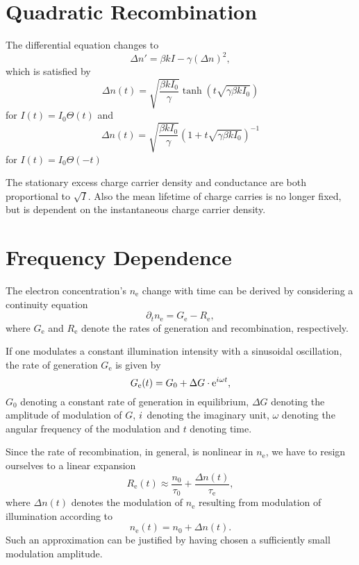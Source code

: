 \section{Quadratic Recombination}\label{sec:quad-recomb}
The differential equation changes to
\begin{equation*}
	\Delta n' = \beta k I - \gamma (\Delta n)^2,
\end{equation*}
which is satisfied by
\begin{equation*}
	\Delta n (t) = \sqrt{\frac{\beta k I_0}{\gamma}} \tanh \left(t \sqrt{\gamma \beta k I_0} \right)
\end{equation*}
for $I(t) = I_0 \Theta (t)$ and
\begin{equation*}
	\Delta n (t) = \sqrt{\frac{\beta k I_0}{\gamma}} \left(1 + t \sqrt{\gamma \beta k I_0} \right)^{-1}
\end{equation*}
for $I(t) = I_0 \Theta (-t)$

The stationary excess charge carrier density and conductance are both proportional to $\sqrt{I}$.
Also the mean lifetime of charge carries is no longer fixed, but is dependent on the instantaneous charge carrier density.

\section{Frequency Dependence}
The electron concentration's $n_\text{e}$ change with time can be derived by considering a continuity equation
\begin{equation}\label{eq:cont_el}
	\partial_tn_\text{e} = G_\text{e} - R_\text{e},
\end{equation}
where $G_\text{e}$ and $R_\text{e}$ denote the rates of generation and recombination, respectively.

If one modulates a constant illumination intensity with a sinusoidal oscillation, the rate of generation $G_\text{e}$ is given by
\begin{equation}\label{eq:genrate}
	G_\text{e}(t) = G_0 + \Delta G\cdot\mathrm{e}^{{i\mkern1mu}\omega t},
\end{equation}
$G_0$ denoting a constant rate of generation in equilibrium, $\Delta G$ denoting the amplitude of modulation of $G$, ${i\mkern1mu}$ denoting the imaginary unit, $\omega$ denoting the angular frequency of the modulation and $t$ denoting time.

Since the rate of recombination, in general, is nonlinear in $n_\text{e}$, we have to resign ourselves to a linear expansion
\begin{equation}\label{eq:rerate}
	R_\text{e}(t)\approx \frac{n_0}{\tau_0} + \frac{\Delta n(t)}{\tau_\text{e}},
\end{equation}
where $\Delta n(t)$ denotes the modulation of $n_\text{e}$ resulting from modulation of illumination according to
\begin{equation}\label{eq:ansatz_n}
	n_\text{e}(t) = n_0 + \Delta n(t).
\end{equation}
Such an approximation can be justified by having chosen a sufficiently small modulation amplitude.

